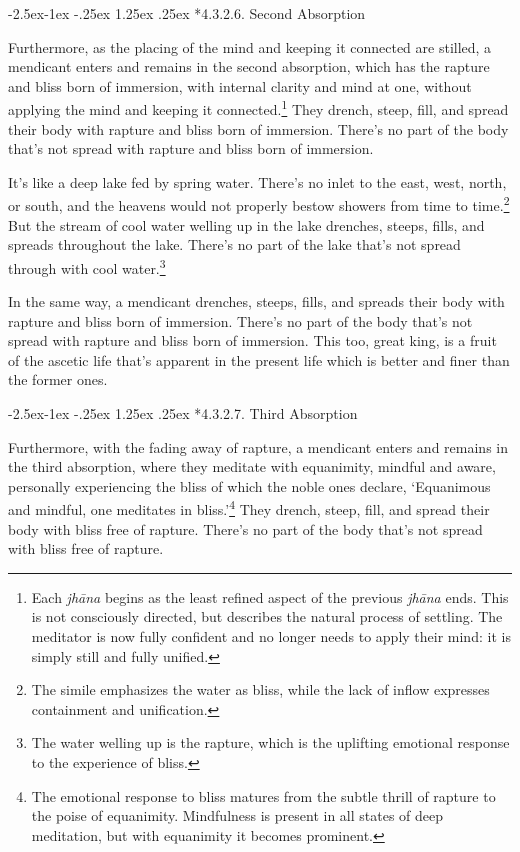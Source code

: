 \documentclass[12pt,openany]{book}%
\makeatletter
\renewcommand\paragraph{\@startsection{paragraph}{4}{\z@}%
            {-2.5ex\@plus -1ex \@minus -.25ex}%
            {1.25ex \@plus .25ex}%
            {\noindent\normalfont\itshape\small}}
\makeatother
\begin{document}
\paragraph*{4.3.2.6. Second Absorption }

Furthermore, as the placing of the mind and keeping it connected are stilled, a mendicant enters and remains in the second absorption, which has the rapture and bliss born of immersion, with internal clarity and mind at one, without applying the mind and keeping it connected.\footnote{Each \textit{\textsanskrit{jhāna}} begins as the least refined aspect of the previous \textit{\textsanskrit{jhāna}} ends. This is not consciously directed, but describes the natural process of settling. The meditator is now fully confident and no longer needs to apply their mind: it is simply still and fully unified. } They drench, steep, fill, and spread their body with rapture and bliss born of immersion. There’s no part of the body that’s not spread with rapture and bliss born of immersion. 

It’s like a deep lake fed by spring water. There’s no inlet to the east, west, north, or south, and the heavens would not properly bestow showers from time to time.\footnote{The simile emphasizes the water as bliss, while the lack of inflow expresses containment and unification. } But the stream of cool water welling up in the lake drenches, steeps, fills, and spreads throughout the lake. There’s no part of the lake that’s not spread through with cool water.\footnote{The water welling up is the rapture, which is the uplifting emotional response to the experience of bliss. } 

In the same way, a mendicant drenches, steeps, fills, and spreads their body with rapture and bliss born of immersion. There’s no part of the body that’s not spread with rapture and bliss born of immersion. This too, great king, is a fruit of the ascetic life that’s apparent in the present life which is better and finer than the former ones. 

\paragraph*{4.3.2.7. Third Absorption }

Furthermore, with the fading away of rapture, a mendicant enters and remains in the third absorption, where they meditate with equanimity, mindful and aware, personally experiencing the bliss of which the noble ones declare, ‘Equanimous and mindful, one meditates in bliss.’\footnote{The emotional response to bliss matures from the subtle thrill of rapture to the poise of equanimity. Mindfulness is present in all states of deep meditation, but with equanimity it becomes prominent. } They drench, steep, fill, and spread their body with bliss free of rapture. There’s no part of the body that’s not spread with bliss free of rapture. 
\end{document}
